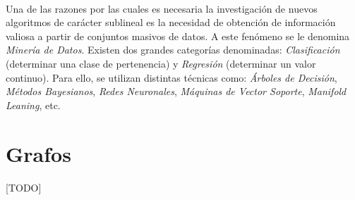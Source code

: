 \documentclass{subfiles}
\begin{document}
        \paragraph{}
        Una de las razones por las cuales es necesaria la investigación de nuevos algoritmos de carácter sublineal es la necesidad de obtención de información valiosa a partir de conjuntos masivos de datos. A este fenómeno se le denomina \emph{Minería de Datos}. Existen dos grandes categorías denominadas: \emph{Clasificación} (determinar una clase de pertenencia) y \emph{Regresión} (determinar un valor continuo). Para ello, se utilizan distintas técnicas como: \emph{Árboles de Decisión}, \emph{Métodos Bayesianos}, \emph{Redes Neuronales}, \emph{Máquinas de Vector Soporte}, \emph{Manifold Leaning}, etc.

    \section{Grafos}
    \label{sec:introduction_graphs}

      \paragraph{}
      [TODO]
\end{document}
